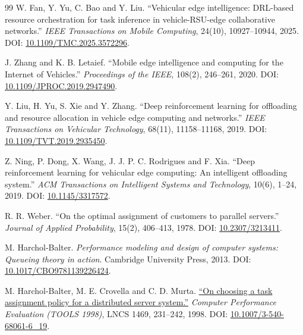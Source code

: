 \documentclass[12pt,a4paper]{article}
\begin{document}
\begin{thebibliography}{99}
 W. Fan, Y. Yu, C. Bao and Y. Liu. ``Vehicular edge intelligence: DRL-based resource orchestration for task inference in vehicle-RSU-edge collaborative networks.'' \emph{IEEE Transactions on Mobile Computing}, 24(10), 10927--10944, 2025. DOI: \href{\detokenize{https://doi.org/10.1109/TMC.2025.3572296}}{10.1109/TMC.2025.3572296}.

 J. Zhang and K. B. Letaief. ``Mobile edge intelligence and computing for the Internet of Vehicles.'' \emph{Proceedings of the IEEE}, 108(2), 246--261, 2020. DOI: \href{\detokenize{https://doi.org/10.1109/JPROC.2019.2947490}}{10.1109/JPROC.2019.2947490}.

 Y. Liu, H. Yu, S. Xie and Y. Zhang. ``Deep reinforcement learning for offloading and resource allocation in vehicle edge computing and networks.'' \emph{IEEE Transactions on Vehicular Technology}, 68(11), 11158--11168, 2019. DOI: \href{\detokenize{https://doi.org/10.1109/TVT.2019.2935450}}{10.1109/TVT.2019.2935450}.

 Z. Ning, P. Dong, X. Wang, J. J. P. C. Rodrigues and F. Xia. ``Deep reinforcement learning for vehicular edge computing: An intelligent offloading system.'' \emph{ACM Transactions on Intelligent Systems and Technology}, 10(6), 1--24, 2019. DOI: \href{\detokenize{https://doi.org/10.1145/3317572}}{10.1145/3317572}.

 R. R. Weber. ``On the optimal assignment of customers to parallel servers.'' \emph{Journal of Applied Probability}, 15(2), 406--413, 1978. DOI: \href{\detokenize{https://doi.org/10.2307/3213411}}{10.2307/3213411}.

 M. Harchol-Balter. \emph{Performance modeling and design of computer systems: Queueing theory in action}. Cambridge University Press, 2013. DOI: \href{\detokenize{https://doi.org/10.1017/CBO9781139226424}}{10.1017/CBO9781139226424}.

 M. Harchol-Balter, M. E. Crovella and C. D. Murta. \href{\detokenize{https://www.cs.cmu.edu/~harchol/Papers/tools.pdf}}{``On choosing a task assignment policy for a distributed server system.''} \emph{Computer Performance Evaluation (TOOLS 1998)}, LNCS 1469, 231--242, 1998. DOI: \href{\detokenize{https://doi.org/10.1007/3-540-68061-6_19}}{10.1007/3-540-68061-6\_19}.


\end{thebibliography}
\end{document}
